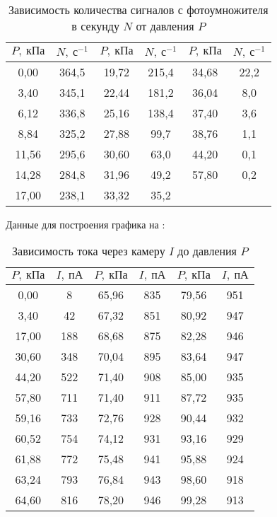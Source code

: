 \documentclass[a4paper, 12pt]{article}
\begin{document}
\renewcommand{\arraystretch}{1.4}
\begin{table}[H]
\centering
\begin{tabular}{|c|c|c|c|cc}
\hline
$P,\: \text{кПа}$    & $N,\: \text{с}^{-1}$     & $P,\: \text{кПа}$     & $N,\: \text{с}^{-1}$     & \multicolumn{1}{c|}{$P,\: \text{кПа}$}     & \multicolumn{1}{c|}{$N,\: \text{с}^{-1}$}    \\ \hline
0,00  & 364,5 & 19,72 & 215,4 & \multicolumn{1}{c|}{34,68} & \multicolumn{1}{c|}{22,2} \\ \hline
3,40  & 345,1 & 22,44 & 181,2 & \multicolumn{1}{c|}{36,04} & \multicolumn{1}{c|}{8,0}  \\ \hline
6,12  & 336,8 & 25,16 & 138,4 & \multicolumn{1}{c|}{37,40} & \multicolumn{1}{c|}{3,6}  \\ \hline
8,84  & 325,2 & 27,88 & 99,7  & \multicolumn{1}{c|}{38,76} & \multicolumn{1}{c|}{1,1}  \\ \hline
11,56 & 295,6 & 30,60 & 63,0  & \multicolumn{1}{c|}{44,20} & \multicolumn{1}{c|}{0,1}  \\ \hline
14,28 & 284,8 & 31,96 & 49,2  & \multicolumn{1}{c|}{57,80} & \multicolumn{1}{c|}{0,2}  \\ \hline
17,00 & 238,1 & 33,32 & 35,2  &                            &                           \\ \cline{1-4}
\end{tabular}
\caption{Зависимость количества сигналов с фотоумножителя в секунду
$N$ от давления $P$}
\end{table}

Данные для построения графика на :

\begin{table}[H]
\centering
\begin{tabular}{|c|c|c|c|c|c|}
\hline
$P,\: \text{кПа}$     &  $I,\: \text{пА}$  & $P,\: \text{кПа}$     &
$I,\: \text{пА}$   & $P,\: \text{кПа}$     & $I,\: \text{пА}$   \\ \hline
0,00  & 8   & 65,96 & 835 & 79,56 & 951 \\ \hline
3,40  & 42  & 67,32 & 851 & 80,92 & 947 \\ \hline
17,00 & 188 & 68,68 & 875 & 82,28 & 946 \\ \hline
30,60 & 348 & 70,04 & 895 & 83,64 & 947 \\ \hline
44,20 & 522 & 71,40 & 908 & 85,00 & 935 \\ \hline
57,80 & 711 & 71,40 & 911 & 87,72 & 935 \\ \hline
59,16 & 733 & 72,76 & 928 & 90,44 & 932 \\ \hline
60,52 & 754 & 74,12 & 931 & 93,16 & 929 \\ \hline
61,88 & 772 & 75,48 & 941 & 95,88 & 924 \\ \hline
63,24 & 793 & 76,84 & 943 & 98,60 & 918 \\ \hline
64,60 & 816 & 78,20 & 946 & 99,28 & 913 \\ \hline
\end{tabular}
\caption{Зависимость тока через камеру $I$ до давления $P$}
\end{table}
\end{document}
